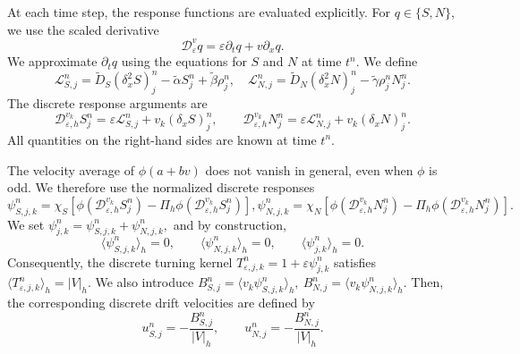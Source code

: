 \documentclass[11pt,twoside]{article}
\numberwithin{equation}{section}
\theoremstyle{plain}
\theoremstyle{nonumberplain}
\begin{document}
{At each time step, the response functions are evaluated explicitly. 
For $q\in\{S,N\}$, we use the scaled derivative
\begin{equation}
\mathcal D_\varepsilon^v q
=\varepsilon\partial_tq+v\partial_xq.
\end{equation}
We approximate $\partial_tq$ using the equations for \(S\) and
\(N\) at time $t^n$. 
We define
\[
\mathcal L_{S,j}^n
=
\widetilde D_S(\delta_x^2 S)_j^n
-\widetilde\alpha S_j^n
+\widetilde\beta \rho_j^n,
\quad 
\mathcal L_{N,j}^n
=
\widetilde D_N(\delta_x^2 N)_j^n
-\widetilde\gamma \rho_j^n N_j^n .
\]
The discrete response arguments are
\[
\mathcal D_{\varepsilon,h}^{v_k}S_j^n
=\varepsilon\mathcal L_{S,j}^n+v_k(\delta_xS)_j^n,
\qquad
\mathcal D_{\varepsilon,h}^{v_k}N_j^n
=\varepsilon\mathcal L_{N,j}^n+v_k(\delta_xN)_j^n.
\]
All quantities on the right-hand sides are known at time $t^n$.

The velocity average of \(\phi(a+bv)\) does not vanish in general, even
when \(\phi\) is odd. We therefore use the normalized discrete responses
\[
\psi_{S,j,k}^n
=\chi_S\left[
\phi\!\left(\mathcal D_{\varepsilon,h}^{v_k}S_j^n\right)
-\Pi_h\phi\!\left(\mathcal D_{\varepsilon,h}^{v_k}S_j^n\right)
\right],
\psi_{N,j,k}^n
=\chi_N\left[
\phi\!\left(\mathcal D_{\varepsilon,h}^{v_k}N_j^n\right)
-\Pi_h\phi\!\left(\mathcal D_{\varepsilon,h}^{v_k}N_j^n\right)
\right].
\]
We set
$\psi_{j,k}^n
=
\psi_{S,j,k}^n+\psi_{N,j,k}^n ,$
and by construction,
\[
\langle \psi_{S,j,k}^n\rangle_h=0,
\qquad
\langle \psi_{N,j,k}^n\rangle_h=0,
\qquad
\langle \psi_{j,k}^n\rangle_h=0.
\]
Consequently, the discrete turning kernel $
T_{\varepsilon,j,k}^n
=
1+\varepsilon \psi_{j,k}^n$
satisfies
$
\langle T_{\varepsilon,j,k}^n\rangle_h=|V|_h.$
We also introduce
$
B_{S,j}^n
=
\langle v_k\psi_{S,j,k}^n\rangle_h,
\
B_{N,j}^n
=
\langle v_k\psi_{N,j,k}^n\rangle_h.
$
Then, the corresponding discrete drift velocities are defined by
\[
u_{S,j}^n
=
-\frac{B_{S,j}^n}{|V|_h},
\qquad
u_{N,j}^n
=
-\frac{B_{N,j}^n}{|V|_h}.
\]

}
\end{document}
